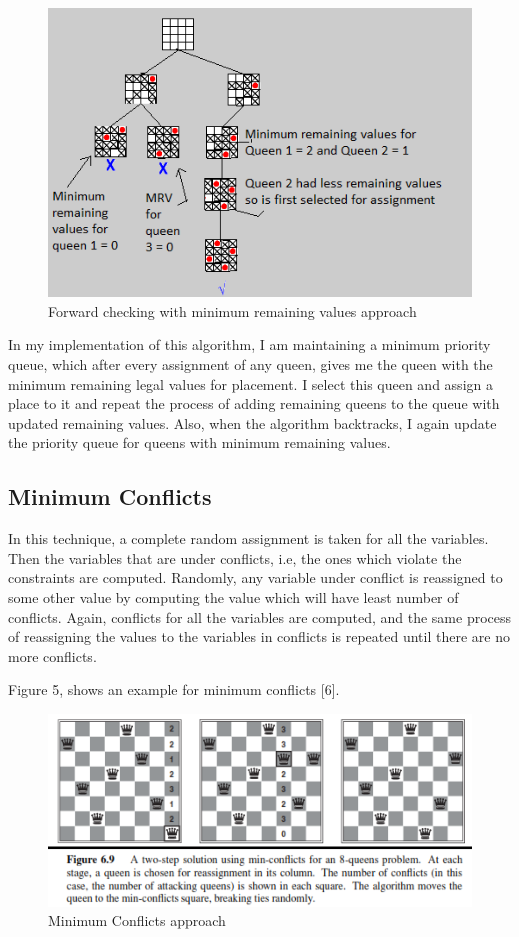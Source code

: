 \documentclass[conference]{IEEEtran}
\begin{document}
\begin{figure}
\includegraphics[scale=0.65]{ForwardCheckingWithMRV.png}
\caption{Forward checking with minimum remaining values approach}
\label{Figure4}
\end{figure}


In my implementation of this algorithm, I am maintaining a minimum priority queue, which after every  assignment of any queen, gives me the queen with the minimum remaining legal values for placement. I select this queen and assign a place to it and repeat the process of adding remaining queens to the queue with updated remaining values. Also, when the algorithm backtracks, I again update the priority queue for queens with minimum remaining values.

\subsection{Minimum Conflicts}

In this technique, a complete random assignment is taken for all the variables. Then the variables that are under conflicts, i.e, the ones which violate the constraints are computed. Randomly, any variable under conflict is reassigned to some other value by computing the value which will have least number of conflicts. Again, conflicts for all the variables are computed, and the same process of reassigning the values to the variables in conflicts is repeated until there are no more conflicts.

Figure 5, shows an example for minimum conflicts [6]. 
\begin{figure}
\includegraphics[scale=0.65]{MinimumConflicts.png}
\caption{Minimum Conflicts approach}
\label{Figure5}
\end{figure}
\end{document}
